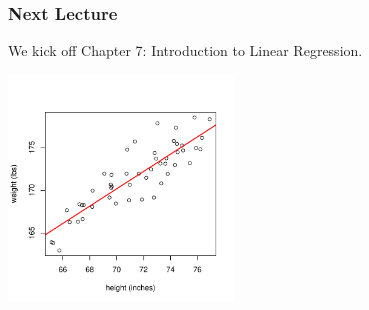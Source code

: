 \documentclass[slides]{beamer}
\begin{document}
\begin{frame}[fragile]
\frametitle{Next Lecture}

We kick off Chapter 7: Introduction to Linear Regression.

\begin{center}
\includegraphics[height=6cm]{figure/lec24-003.pdf}
\end{center}

\end{frame}
\end{document}
